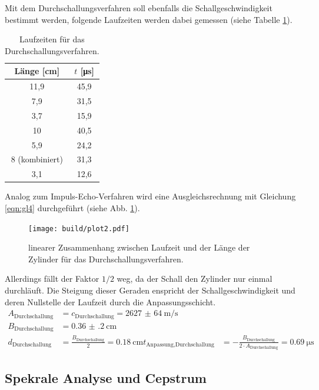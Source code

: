 Mit dem Durchschallungsverfahren soll ebenfalls die Schallgeschwindigkeit bestimmt werden, folgende Laufzeiten werden dabei gemessen (siehe Tabelle \ref{tab:Durch}).
\begin{table}
  \centering
  \caption{Laufzeiten für das Durchschallungsverfahren.}
  \label{tab:Durch}
  \begin{tabular}{c c}
    \toprule
    Länge [\si{\centi\meter}] & $t$ [\si{\micro\second}] \\
    \midrule
    11,9  & 45,9 \\
     7,9  & 31,5 \\
     3,7  & 15,9 \\
      10  & 40,5 \\
     5,9  & 24,2 \\
       8 (kombiniert) & 31,3 \\
     3,1  & 12,6 \\
    \bottomrule
  \end{tabular}
\end{table}
Analog zum Impuls-Echo-Verfahren wird eine Ausgleichsrechnung mit Gleichung \eqref{eqn:gl4} durchgeführt (siehe Abb. \ref{fig:plot2}).
\begin{figure}
  \texttt{[image: build/plot2.pdf]}
  \caption{linearer Zusammenhang zwischen Laufzeit und der Länge der Zylinder für das Durchschallungsverfahren.}
  \label{fig:plot2}
\end{figure}
Allerdings fällt der Faktor $1/2$ weg, da der Schall den Zylinder nur einmal durchläuft.
Die Steigung dieser Geraden enspricht der Schallgeschwindigkeit und deren Nullstelle der Laufzeit durch die Anpassungsschicht.
\begin{align*}
  A_\text{Durchschallung} &= c_\text{Durchschallung} = \SI{2627(64)}{\meter\per\second} \\
  B_\text{Durchschallung} &= \SI{0.36(20)}{\centi\meter} \\
  d_\text{Durchschallung} &= \frac{B_\text{Durchschallung}}{2} = \SI{0.18}{\centi\meter}
  t_\text{Anpassung,Durchschallung} &= - \frac{B_\text{Durchschallung}}{2 \cdot A_\text{Durchschallung}} =\SI{0.69}{\micro\second}
\end{align*}

\subsection{Spekrale Analyse und Cepstrum}
\label{sec:cep}

